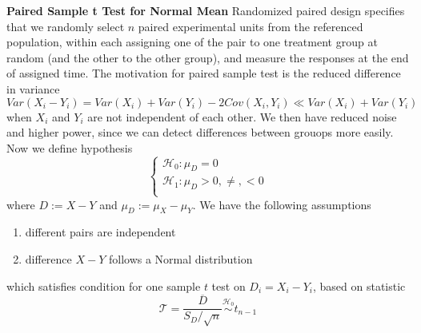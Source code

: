 \documentclass[11pt]{article}
\begin{document}
\begin{example}
  \textbf{Paired Sample t Test for Normal Mean} Randomized paired design specifies that we randomly select $n$ paired experimental units from the referenced population, within each assigning one of the pair to one treatment group at random (and the other to the other group), and measure the responses at the end of assigned time. The motivation for paired sample test is the reduced difference in variance
  \[
    Var(X_i - Y_i) = Var(X_i) + Var(Y_i) - 2Cov(X_i, Y_i) \ll Var(X_i) + Var(Y_i)
  \]
  when $X_i$ and $Y_i$ are not independent of each other. We then have reduced noise and higher power, since we can detect differences between grouops more easily. Now we define hypothesis
  \[
    \begin{cases*}
      \mathcal{H}_0: \mu_D = 0 \\
      \mathcal{H}_1: \mu_D > 0, \neq, < 0\\
    \end{cases*}
  \]
  where $D := X - Y$ and $\mu_D := \mu_X - \mu_Y$. We have the following assumptions
  \begin{enumerate}
    \item different pairs are independent
    \item difference $X-Y$ follows a Normal distribution
  \end{enumerate}
  which satisfies condition for one sample $t$ test on $D_i = X_i - Y_i$, based on statistic
  \[
    \mathcal{T} = \frac{\overline{D}}{S_D / \sqrt{n}} \stackrel{\mathcal{H}_0}{\sim} t_{n-1}
  \]
\end{example}
\end{document}
